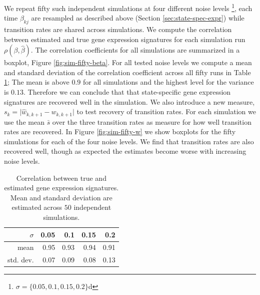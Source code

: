 We repeat fifty such independent simulations at four different noise levels \footnote{$\sigma=\lbrace 0.05, 0.1, 0.15, 0.2 \rbrace$d}, each time $\beta_{kj}$ are resampled as described above (Section \ref{sec:state-spec-expr}) while transition rates are shared across simulations. We compute the correlation between estimated and true gene expression signatures for each simulation run $\rho(\beta,\hat{\beta})$. The correlation coefficients for all simulations are summarized in a boxplot, Figure \ref{fig:sim-fifty-beta}. For all tested noise levels we compute a mean and standard deviation of the correlation coefficient across all fifty runs in Table \ref{tab:cor-beta-fifty}; The mean is above $0.9$ for all simulations and the highest level for the variance is $0.13$. Therefore we can conclude that that state-specific gene expression signatures are recovered well in the simulation. We also introduce a new measure, $s_k = \lvert \hat{w}_{k,k+1} - w_{k,k+1} \rvert$ to test recovery of transition rates. For each simulation we use the mean $\bar{s}$ over the three transition rates as measure for how well transition rates are recovered. In Figure \ref{fig:sim-fifty-w} we show boxplots for the fifty simulations for each of the four noise levels. We find that transition rates are also recovered well, though as expected the estimates become worse with increasing noise levels.

\begin{table}[ht]
\centering
\begin{tabular}{rrrrr}
  \hline
$\sigma$ & 0.05 & 0.1 & 0.15 & 0.2 \\ 
  \hline
mean & 0.95 & 0.93 & 0.94 & 0.91 \\ 
std. dev. & 0.07 & 0.09 & 0.08 & 0.13 \\ 
   \hline
 \end{tabular}
 \caption{Correlation between true and estimated gene expression signatures. Mean and standard deviation are estimated across $50$ independent simulations.}
 \label{tab:cor-beta-fifty}
\end{table}

